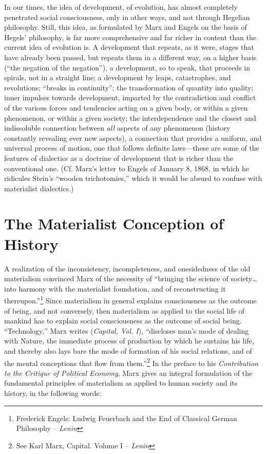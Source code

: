 \documentclass[a4paper,12pt]{book}
\begin{document}
In our times, the idea of development, of evolution, has almost completely penetrated social consciousness, only in other ways, and not through Hegelian philosophy. Still, this idea, as formulated by Marx and Engels on the basis of Hegels’ philosophy, is far more comprehensive and far richer in content than the current idea of evolution is. A development that repeats, as it were, stages that have already been passed, but repeats them in a different way, on a higher basis (“the negation of the negation”), a development, so to speak, that proceeds in spirals, not in a straight line; a development by leaps, catastrophes, and revolutions; “breaks in continuity”; the transformation of quantity into quality; inner impulses towards development, imparted by the contradiction and conflict of the various forces and tendencies acting on a given body, or within a given phenomenon, or within a given society; the interdependence and the closest and indissoluble connection between \emph{all} aspects of any phenomenon (history constantly revealing ever new aspects), a connection that provides a uniform, and universal process of motion, one that follows definite laws—these are some of the features of dialectics as a doctrine of development that is richer than the conventional one. (Cf. Marx’s letter to Engels of January 8, 1868, in which he ridicules Stein’s “wooden trichotomies,” which it would be absurd to confuse with materialist dialectics.)

\section*{The Materialist Conception of History}

A realization of the inconsistency, incompleteness, and onesidedness of the old materialism convinced Marx of the necessity of “bringing the science of society\ldots{} into harmony with the materialist foundation, and of reconstructing it thereupon.”\footnote{Frederick Engels: Ludwig Feuerbach and the End of Classical German Philosophy -- \emph{Lenin}} Since materialism in general explains consciousness as the outcome of being, and not conversely, then materialism as applied to the social life of mankind has to explain social consciousness as the outcome of social being. “Technology,” Marx writes (\emph{Capital, Vol. I}), “discloses man’s mode of dealing with Nature, the immediate process of production by which he sustains his life, and thereby also lays bare the mode of formation of his social relations, and of the mental conceptions that flow from them.”\footnote{See Karl Marx, Capital. Volume I -- \emph{Lenin}} In the preface to his \emph{Contribution to the Critique of Political Economy}, Marx gives an integral formulation of the fundamental principles of materialism as applied to human society and its history, in the following words:
\end{document}
